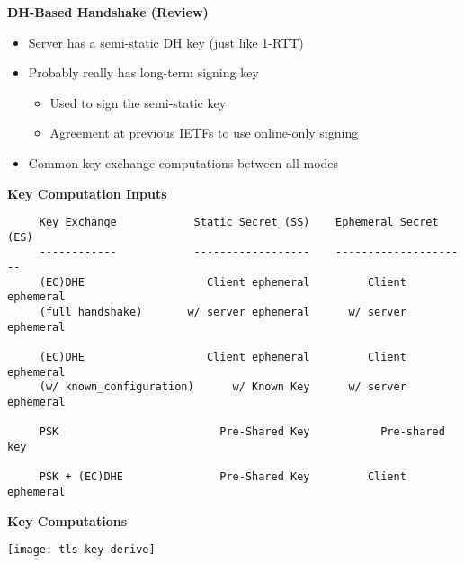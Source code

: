 \documentclass[helvetica]{seminar}
\newcommand{\heading}[1]{%
  \begin{center} 
    \large\bf 
    #1 
  \end{center} 
  \vspace{.4 in}}
\begin{document}
\begin{slide}
\heading{DH-Based Handshake (Review)}

\begin{itemize}
\item Server has a semi-static DH key (just like 1-RTT)
\item Probably really has long-term signing key
  \begin{itemize}
  \item Used to sign the semi-static key
  \item Agreement at previous IETFs to use online-only signing
  \end{itemize}

\item Common key exchange computations between all modes
\end{itemize}
\end{slide}


\begin{slide}
\heading{Key Computation Inputs}

\begin{footnotesize}
\begin{verbatim}
     Key Exchange            Static Secret (SS)    Ephemeral Secret (ES)
     ------------            ------------------    ---------------------
     (EC)DHE                   Client ephemeral         Client ephemeral
     (full handshake)       w/ server ephemeral      w/ server ephemeral

     (EC)DHE                   Client ephemeral         Client ephemeral
     (w/ known_configuration)      w/ Known Key      w/ server ephemeral

     PSK                         Pre-Shared Key           Pre-shared key

     PSK + (EC)DHE               Pre-Shared Key         Client ephemeral
\end{verbatim}
\end{footnotesize}
\end{slide}


\begin{slide}
\heading{Key Computations}

\begin{center}
\texttt{[image: tls-key-derive]}
\end{center}

\end{slide}
\end{document}
